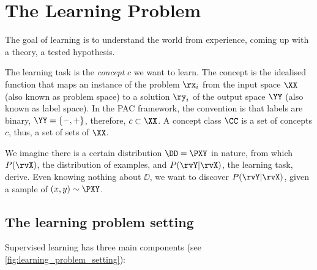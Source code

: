 \section {The Learning Problem}
The goal of learning is to understand the world from experience, coming up with a theory, a tested hypothesis.

The learning task is the \emph{concept} \(c\) we want to learn. The concept is the idealised function that maps an instance of the problem \(\rx_i\) from the input space \(\XX\) (also known as problem space) to a solution \(\ry_i\) of the output space \(\YY\) (also known as label space). In the PAC framework, the convention is that labels are binary, \(\YY = \{-, +\}\), therefore, \(c \subset \XX\). A concept class \(\CC\) is a set of concepts \(c\), thus, a set of sets of \(\XX\).

We imagine there is a certain distribution \(\DD = \PXY \) in nature, from which \(P(\rvX)\), the distribution of examples, and \(P(\rvY|\rvX)\), the learning task, derive. Even knowing nothing about \(\DD\), we want to discover \(P(\rvY|\rvX)\), given a sample of \((x, y) \sim \PXY\).

\subsection{The learning problem setting}

Supervised learning has three main components (see \cref{fig:learning_problem_setting}):

